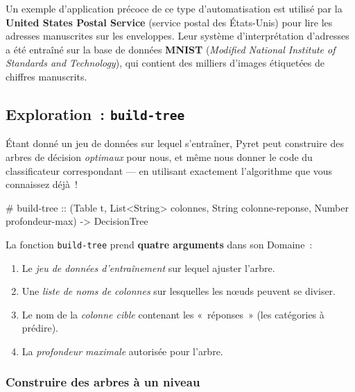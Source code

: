 \documentclass[12pt,a4paper]{article}
\newcommand{\contrat}[1]{%
  \begin{contractbox}
    \ttfamily #1
  \end{contractbox}
}
\begin{document}
\begin{keypointbox}
  Un exemple d'application précoce de ce type d'automatisation est utilisé par la \textbf{United States Postal Service} (service postal des États-Unis) pour lire les adresses manuscrites sur les enveloppes. Leur système d'interprétation d'adresses a été entraîné sur la base de données \textbf{MNIST} (\emph{Modified National Institute of Standards and Technology}), qui contient des milliers d'images étiquetées de chiffres manuscrits.
\end{keypointbox}

\subsection{Exploration~: \texttt{build-tree}}

Étant donné un jeu de données sur lequel s'entraîner, Pyret peut construire des arbres de décision \emph{optimaux} pour nous, et même nous donner le code du classificateur correspondant — en utilisant exactement l'algorithme que vous connaissez déjà~!

\contrat{\# build-tree :: (Table t, List<String> colonnes, String colonne-reponse, Number profondeur-max) -> DecisionTree}

La fonction \texttt{build-tree} prend \textbf{quatre arguments} dans son Domaine~:
\begin{enumerate}[leftmargin=*]
  \item Le \emph{jeu de données d'entraînement} sur lequel ajuster l'arbre.
  \item Une \emph{liste de noms de colonnes} sur lesquelles les nœuds peuvent se diviser.
  \item Le nom de la \emph{colonne cible} contenant les «~réponses~» (les catégories à prédire).
  \item La \emph{profondeur maximale} autorisée pour l'arbre.
\end{enumerate}

\subsubsection{Construire des arbres à un niveau}
\end{document}
